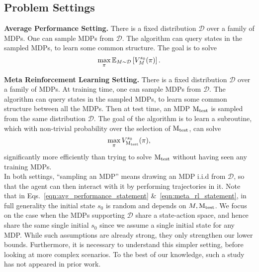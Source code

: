 \documentclass[11pt,twoside]{article}
\begin{document}
\subsection{Problem Settings}
\noindent \textbf{Average Performance Setting.} There is a fixed distribution $\mathcal{D}$ over a family of MDPs. One can sample MDPs from $\mathcal{D}$. The algorithm can query states in the sampled MDPs, to learn some common structure. The goal is to solve
\begin{equation}
\label{eqn:avg_performance_statement}
\max_{\pi} \operatorname{\mathbb{E}}_{M \sim \mathcal{D}} \left[ V^{{s_0 }}_{{M }}({\pi}) \right].
\end{equation}

\noindent \textbf{Meta Reinforcement Learning Setting.} There is a fixed distribution $\mathcal{D}$ over a family of MDPs. At training time, one can sample MDPs from $\mathcal{D}$. The algorithm can query states in the sampled MDPs, to learn some common structure between all the MDPs. Then at test time, an MDP $\operatorname{M_{test}}$ is sampled from the same distribution $\mathcal{D}$. The goal of the algorithm is to learn a subroutine, which with non-trivial probability over the selection of $\operatorname{M_{test}}$, can solve
\begin{equation}
\label{eqn:meta_rl_statement}
\max_{\pi} V^{{s_0 }}_{{\operatorname{M_{test}} }}({\pi}),
\end{equation}
significantly more efficiently than trying to solve $\operatorname{M_{test}}$ without having seen any training MDPs. \\

\noindent In both settings, ``sampling an MDP'' means drawing an MDP i.i.d from $\mathcal{D}$, so that the agent can then interact with it by performing trajectories in it. Note that in Eqs.~\eqref{eqn:avg_performance_statement} \&~\eqref{eqn:meta_rl_statement}, in full generality the initial state $s_0$ is random and depends on $M, \operatorname{M_{test}}$. We focus on the case when the MDPs supporting $\mathcal{D}$ share a state-action space, and hence share the same single initial $s_0$ since we assume a single initial state for any MDP. While such assumptions are already strong, they only strengthen our lower bounds. Furthermore, it is necessary to understand this simpler setting, before looking at more complex scenarios. To the best of our knowledge, such a study has not appeared in prior work.
\end{document}
